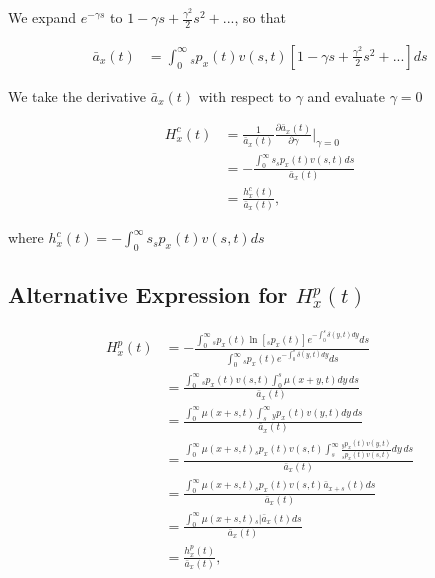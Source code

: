 \documentclass[12pt]{article}
\begin{document}
{We expand $e^{-\gamma s}$ to $1-\gamma s+\frac{\gamma^2}{2} s^{2} +...$, so that


\begin{equation}\label{eq:EntropyConst2}
\begin{split}
\bar{a}_{x}(t) &= \int_0^\infty {}_sp_x(t) {v}(s,t)[1-\gamma s+\frac{\gamma^2}{2} s^{2} +...]ds
\end{split}
\end{equation}

We take the derivative $\bar{a}_{x}(t)$ with respect to $\gamma$ and evaluate $\gamma=0$


\begin{equation}\label{eq:EntropyConst3}
\begin{split}
{H}^{c}_x(t)&=\frac{1}{\bar{a}_x(t)}\frac{\partial \bar{a}_x(t)}{\partial \gamma} \bigg\rvert_{\gamma=0}\\
&= -\frac{\int_0^\infty s {}_sp_x(t) {v}(s,t)ds}{\bar{a}_x(t)} \\
&= \frac{{h}^{c}_x(t)}{\bar{a}_x(t)},
\end{split}
\end{equation}

where ${h}^{c}_x(t)=-\int_0^\infty s {}_sp_x(t) {v}(s,t)ds$



\subsection{Alternative Expression for ${H}^{p}_{x}(t)$}\label{sec:EntropyAlt}

\begin{equation} \label{eq:EntropyAnnuityA1}
\begin{split}
{H}^{p}_{x}(t) &= -\frac{ \int_{0}^{\infty}{}_sp_x(t)\ln[{}_sp_x(t)] e^{-\int_{0}^{s}\delta(y,t)dy} ds}{\int_0^\infty {}_sp_x(t) e^{-\int_{0}^{s}\delta(y,t)dy} ds}\\
&= \frac{\int_0^\infty {}_sp_x(t) {v}(s,t) \int_0^s \mu(x+y,t) dy\,ds}{\bar{a}_x(t)}\\
&= \frac{\int_0^\infty  \mu(x+s,t) \int_s^\infty {}_yp_x(t) {v}(y,t)  dy\,ds}{\bar{a}_x(t)}\\
&= \frac{\int_0^\infty  \mu(x+s,t)  {}_sp_x(t) {v}(s,t) \int_s^\infty \frac{ {}_yp_x(t) {v}(y,t)}{ {}_sp_x(t) {v}(s,t)}  dy\,ds}{\bar{a}_x(t)}\\
&=  \frac{\int_0^\infty \mu(x+s,t)   {}_sp_x(t) {v}(s,t) \bar{a}_{x+s}(t) ds}{\bar{a}_x(t)} \\
&=  \frac{\int_0^\infty \mu(x+s,t)  {}_s|\bar{a}_x(t) ds}{\bar{a}_x(t)} \\
&=  \frac{{h}^{p}_{x}(t)}{\bar{a}_x(t)}, \\
\end{split}
\end{equation}

}
\end{document}
